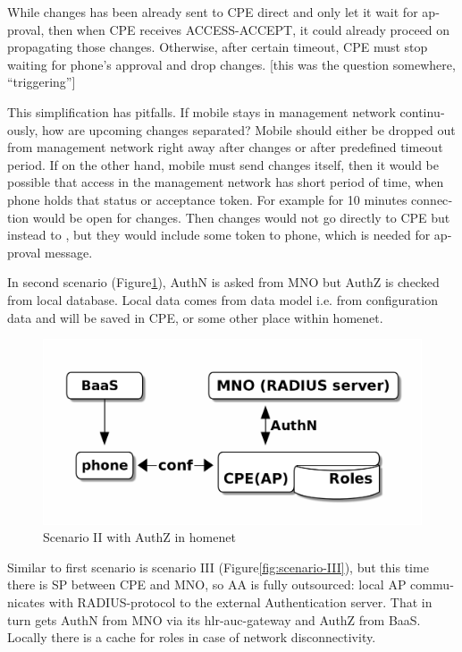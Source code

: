 \documentclass[12pt,a4paper,english]{tutthesis}
\begin{document}
\begin{otherlanguage}{english}
While changes has been already sent to CPE direct and only let it
wait for approval, then when CPE receives ACCESS-ACCEPT, it could
already proceed on propagating those
changes.  Otherwise, after certain timeout, CPE must stop waiting
for phone's approval and drop changes. [this was the question
somewhere, ``triggering'']


This simplification has pitfalls. If mobile stays in management
network continuously, how are upcoming changes separated? Mobile should
either be dropped out from management network right away after changes or
after predefined timeout period.  If on the other hand, mobile must
send changes itself, then it would be possible that access in the
management network has short period of time, when phone 
holds that status or acceptance token. For example for 10 minutes connection
would be open for changes. Then changes would not go directly to CPE
but instead to , but they would include some token to phone, which is
needed for approval message.


\label{scenario-ii}

In second scenario (Figure\ref{fig:scenario-II}), AuthN is asked from MNO but
AuthZ is checked from local database. Local data comes from data model
i.e. from configuration data and will be saved in CPE, or some other
place within homenet.


\begin{figure}[htb]
\centering
\includegraphics[width=.9\linewidth]{scenII.png}
\caption{\label{fig:scenario-II}Scenario II with AuthZ in homenet}
\end{figure}


\label{scenario-iii}

Similar to first scenario is scenario III (Figure\ref{fig:scenario-III}), 
but this time there is SP between CPE and MNO, so AA is fully outsourced:
local AP communicates with RADIUS-protocol to the external
Authentication server. That in turn gets AuthN from MNO via its
hlr-auc-gateway and AuthZ from BaaS.
Locally there is a cache for roles in case of network disconnectivity.


\end{otherlanguage}
\end{document}
